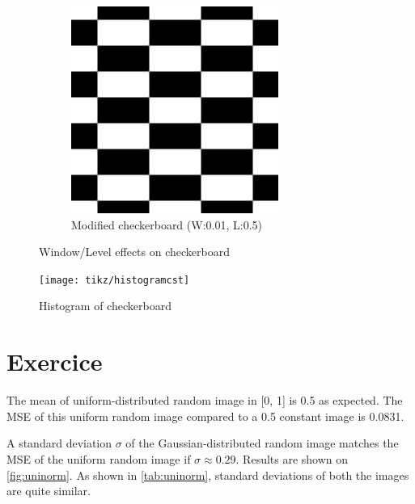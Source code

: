 \documentclass[12pt,english]{article}
\renewcommand{\thesection}{Exercice~\arabic{section}}
\begin{document}
\begin{figure}
\begin{subfigure}[t]{0.4\textwidth}
		\includegraphics[width=.9\textwidth]{img/cstwl}
		\caption{Modified checkerboard (W:0.01, L:0.5)}
		\label{fig:cstwl}
	\end{subfigure}
	\caption{Window/Level effects on checkerboard}
	\label{fig:checkerboard}
\end{figure}

\begin{figure}
	\centering
	\texttt{[image: tikz/histogramcst]}
	\caption{Histogram of checkerboard}
	\label{fig:csth}
\end{figure}

\section[]{\thesection}
The mean of uniform-distributed random image in [0, 1] is 0.5 as expected. The MSE of this uniform random image compared to a 0.5 constant image is 0.0831.

A standard deviation $\sigma$ of the Gaussian-distributed random image matches the MSE of the uniform random image if $\sigma \approx 0.29$. Results are shown on \autoref{fig:uninorm}. As shown in \autoref{tab:uninorm}, standard deviations of both the images are quite similar.
\end{document}
